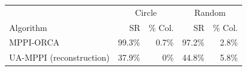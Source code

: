 \begin{tabular}{lrrrr}
\toprule
 & \multicolumn{2}{c}{Circle} & \multicolumn{2}{c}{Random} \\
Algorithm & SR & \% Col. & SR & \% Col. \\
\midrule
MPPI-ORCA & 99.3\% & 0.7\% & 97.2\% & 2.8\% \\
UA-MPPI (reconstruction) & 37.9\% & 0\% & 44.8\% & 5.8\% \\
\bottomrule
\end{tabular}
